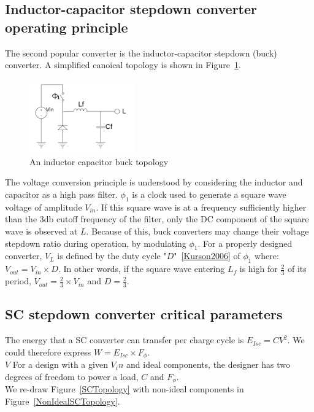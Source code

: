 \documentclass[letterpaper,twocolumn,10pt]{article}
\begin{document}
\subsection{Inductor-capacitor stepdown converter operating principle}

The second popular converter is the inductor-capacitor stepdown (buck) converter. A simplified canoical topology is shown in Figure~\ref{BKTopology}.\\
\begin{figure}[here]
\includegraphics[width=0.4\textwidth]{BKTopology}
\caption{An inductor capacitor buck topology}
\label{BKTopology}
\end{figure}

The voltage conversion principle is understood by considering the inductor and capacitor as a high pass filter. $\phi_1$ is a clock used to generate a square wave voltage of amplitude $V_{in}$. If this square wave is at a frequency sufficiently higher than the 3db cutoff frequency of the filter, only the DC component of the square wave is observed at $L$. Because of this, buck converters may change their voltage stepdown ratio during operation, by modulating $\phi_1$. For a properly designed converter, $V_L$ is defined by the duty cycle "$D$"~\ref{Kurson2006} of $\phi_1$ where: $V_{out} = V_{in} \times D$. In other words, if the square wave entering $L_f$ is high for $\frac{2}{3}$ of its period, $V_{out} = \frac{2}{3}\times V_{in}$ and $D = \frac{2}{3}$.\\ 

\subsection{SC stepdown converter critical parameters}
The energy that a SC converter can transfer per charge cycle is $E_{Isc} = CV^2$. We could therefore express $W = E_{Isc}\times F_\phi$.\\
$V$ For a design with a given $V_in$ and ideal components, the designer has two degrees of freedom to power a load, $C$ and $F_\phi$.\\  
We re-draw Figure~\ref{SCTopology} with non-ideal components in Figure~\ref{NonIdealSCTopology}.\\
\end{document}
